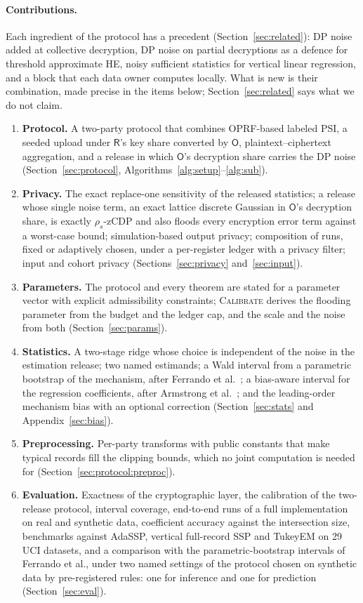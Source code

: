 \documentclass[11pt]{article}
\theoremstyle{definition}
\theoremstyle{plain}
\newcommand{\Party}[1]{\textsf{#1}}
\newcommand{\Rp}{\Party{R}}
\newcommand{\Op}{\Party{O}}
\begin{document}
\paragraph{Contributions.} Each ingredient of the protocol has a precedent (Section~\ref{sec:related}): DP noise added at collective decryption, DP noise on partial decryptions as a defence for threshold approximate HE, noisy sufficient statistics for vertical linear regression, and a block that each data owner computes locally. What is new is their combination, made precise in the items below; Section~\ref{sec:related} says what we do not claim.
\begin{enumerate}[noitemsep]
  \item \textbf{Protocol.} A two-party protocol that combines OPRF-based labeled PSI, a seeded upload under $\Rp$'s key share converted by $\Op$, plaintext--ciphertext aggregation, and a release in which $\Op$'s decryption share carries the DP noise (Section~\ref{sec:protocol}, Algorithms~\ref{alg:setup}--\ref{alg:sub}).
  \item \textbf{Privacy.} The exact replace-one sensitivity of the released statistics; a release whose single noise term, an exact lattice discrete Gaussian in $\Op$'s decryption share, is exactly $\rho_s$-zCDP and also floods every encryption error term against a worst-case bound; simulation-based output privacy; composition of runs, fixed or adaptively chosen, under a per-register ledger with a privacy filter; input and cohort privacy (Sections~\ref{sec:privacy} and~\ref{sec:input}).
  \item \textbf{Parameters.} The protocol and every theorem are stated for a parameter vector with explicit admissibility constraints; \textsc{Calibrate} derives the flooding parameter from the budget and the ledger cap, and the scale and the noise from both (Section~\ref{sec:params}).
  \item \textbf{Statistics.} A two-stage ridge whose choice is independent of the noise in the estimation release; two named estimands; a Wald interval from a parametric bootstrap of the mechanism, after Ferrando et al.~\cite{ferrando2022parametric}; a bias-aware interval for the regression coefficients, after Armstrong et al.~\cite{armstrong2020bias}; and the leading-order mechanism bias with an optional correction (Section~\ref{sec:stats} and Appendix~\ref{sec:bias}).
  \item \textbf{Preprocessing.} Per-party transforms with public constants that make typical records fill the clipping bounds, which no joint computation is needed for (Section~\ref{sec:protocol:preproc}).
  \item \textbf{Evaluation.} Exactness of the cryptographic layer, the calibration of the two-release protocol, interval coverage, end-to-end runs of a full implementation on real and synthetic data, coefficient accuracy against the intersection size, benchmarks against AdaSSP, vertical full-record SSP and TukeyEM on 29 UCI datasets, and a comparison with the parametric-bootstrap intervals of Ferrando et al., under two named settings of the protocol chosen on synthetic data by pre-registered rules: one for inference and one for prediction (Section~\ref{sec:eval}).
\end{enumerate}
\end{document}
